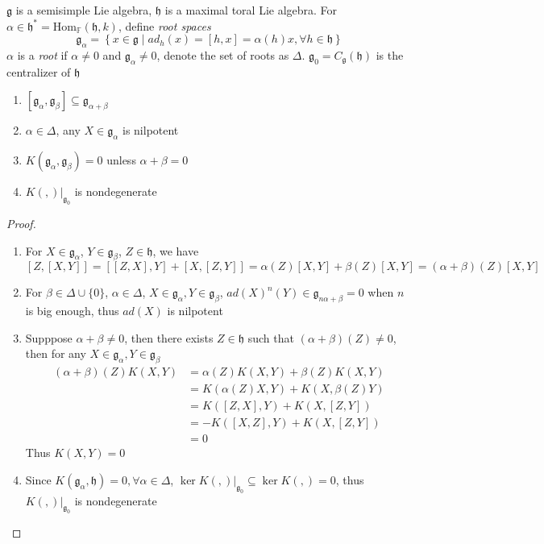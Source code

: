 \documentclass[main]{subfiles}
\begin{document}
\begin{definition}
$\mathfrak{g}$ is a semisimple Lie algebra, $\mathfrak{h}$ is a maximal toral Lie algebra. For $\alpha\in\mathfrak{h}^*=\mathrm{Hom}_\mathbb{F}(\mathfrak h,k)$, define \textit{root spaces}
\[\mathfrak{g}_\alpha=\left\{x\in\mathfrak{g}\middle|ad_h(x)=[h,x]=\alpha(h)x,\forall h\in\mathfrak{h}\right\}\]
$\alpha$ is a \textit{root} if $\alpha\neq0$ and $\mathfrak g_{\alpha}\neq0$, denote the set of roots as $\Delta$. $\mathfrak{g}_0=C_\mathfrak{g}(\mathfrak{h})$ is the centralizer of $\mathfrak{h}$
\end{definition}

\begin{proposition}\label{Basic properties of root spaces} \hfill
\begin{enumerate}[leftmargin=*,label=\textit{(\alph*)}]
\item $[\mathfrak{g}_\alpha,\mathfrak{g}_\beta]\subseteq\mathfrak{g}_{\alpha+\beta}$
\item $\alpha\in\Delta$, any $X\in\mathfrak{g}_\alpha$ is nilpotent
\item $K(\mathfrak{g}_\alpha,\mathfrak{g}_\beta)=0$ unless $\alpha+\beta=0$
\item $K(,)|_{\mathfrak{g}_0}$ is nondegenerate
\end{enumerate}
\end{proposition}

\begin{proof} \hfill
\begin{enumerate}[leftmargin=*,label=\textit{(\alph*)}]
\item For $X\in\mathfrak{g}_\alpha$, $Y\in\mathfrak{g}_\beta$, $Z\in\mathfrak{h}$, we have
\[[Z,[X,Y]]=[[Z,X],Y]+[X,[Z,Y]]=\alpha(Z)[X,Y]+\beta(Z)[X,Y]=(\alpha+\beta)(Z)[X,Y]\]
\item For $\beta\in\Delta\cup\{0\}$, $\alpha\in\Delta$, $X\in\mathfrak{g}_\alpha,Y\in\mathfrak{g}_\beta$, $ad(X)^n(Y)\in\mathfrak{g}_{n\alpha+\beta}=0$ when $n$ is big enough, thus $ad(X)$ is nilpotent
\item Supppose $\alpha+\beta\neq0$, then there exists $Z\in\mathfrak{h}$ such that $(\alpha+\beta)(Z)\neq0$, then for any $X\in\mathfrak{g}_\alpha,Y\in\mathfrak{g}_\beta$
\begin{align*}
(\alpha+\beta)(Z)K(X,Y)&=\alpha(Z)K(X,Y)+\beta(Z)K(X,Y) \\
&=K(\alpha(Z)X,Y)+K(X,\beta(Z)Y) \\
&=K([Z,X],Y)+K(X,[Z,Y]) \\
&=-K([X,Z],Y)+K(X,[Z,Y]) \\
&=0
\end{align*}
Thus $K(X,Y)=0$
\item Since $K(\mathfrak{g}_\alpha,\mathfrak{h})=0,\forall\alpha\in\Delta$, $\ker K(,)|_{\mathfrak{g}_0}\subseteq\ker K(,)=0$, thus $K(,)|_{\mathfrak{g}_0}$ is nondegenerate
\end{enumerate}
\end{proof}
\end{document}
